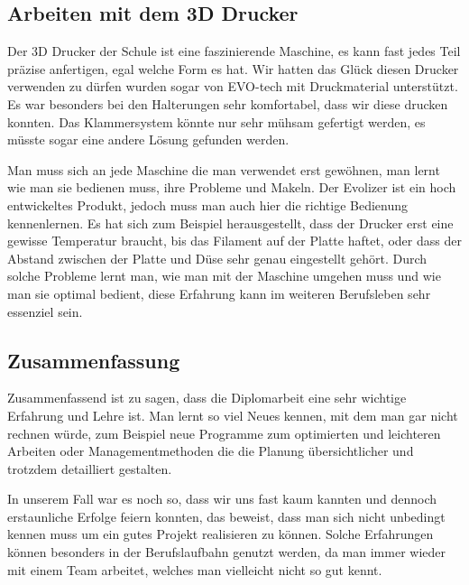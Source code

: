 	\subsection{Arbeiten mit dem 3D Drucker}

	Der 3D Drucker der Schule ist eine faszinierende Maschine, es kann fast jedes Teil präzise anfertigen, egal welche Form es hat.
	Wir hatten das Glück diesen Drucker verwenden zu dürfen \bzw wurden sogar von EVO-tech mit Druckmaterial unterstützt.
	Es war besonders bei den Halterungen sehr komfortabel, dass wir diese drucken konnten. Das Klammersystem könnte nur sehr mühsam gefertigt werden, es müsste sogar eine andere Lösung gefunden werden.

	Man muss sich an jede Maschine die man verwendet erst gewöhnen, man lernt wie man sie bedienen muss, ihre Probleme und Makeln.
	Der Evolizer ist ein hoch entwickeltes Produkt, jedoch muss man auch hier die richtige Bedienung kennenlernen.
	Es hat sich zum Beispiel herausgestellt, dass der Drucker erst eine gewisse Temperatur braucht, bis das Filament auf der Platte haftet, oder dass der Abstand zwischen der Platte und Düse sehr genau eingestellt gehört.
	Durch solche Probleme lernt man, wie man mit der Maschine umgehen muss und wie man sie optimal bedient, diese Erfahrung kann im weiteren Berufsleben sehr essenziel sein.

	\subsection{Zusammenfassung}

	Zusammenfassend ist zu sagen, dass die Diplomarbeit eine sehr wichtige Erfahrung und Lehre ist.
	Man lernt so viel Neues kennen, mit dem man gar nicht rechnen würde, zum Beispiel neue Programme zum optimierten und leichteren Arbeiten oder Managementmethoden die die Planung übersichtlicher und trotzdem detailliert gestalten.

 	In unserem Fall war es noch so, dass wir uns fast kaum kannten und dennoch erstaunliche Erfolge feiern konnten,
	das beweist, dass man sich nicht unbedingt kennen muss um ein gutes Projekt realisieren zu können. Solche Erfahrungen können besonders in der Berufslaufbahn genutzt werden,
	da man immer wieder mit einem Team arbeitet, welches man vielleicht nicht so gut kennt.
